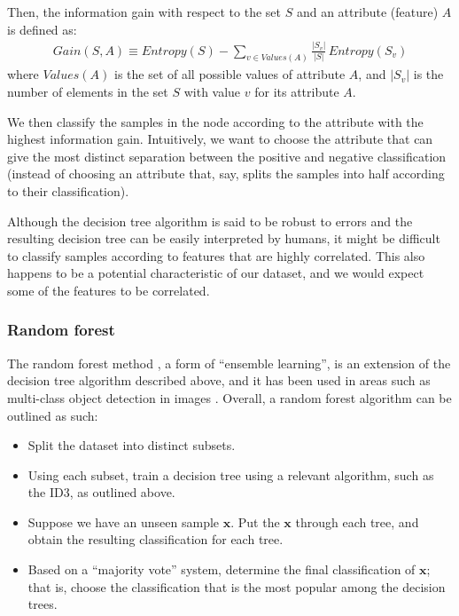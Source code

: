 \documentclass[12pt, twoside, a4paper]{article}
\begin{document}
Then, the information gain with respect to the set $S$ and an attribute (feature) $A$ is defined as:
\begin{align*}
Gain(S, A) \equiv Entropy(S) - \sum_{v \in Values(A)} \frac{|S_v|}{|S|} \, Entropy(S_v)
\end{align*}
where $Values(A)$ is the set of all possible values of attribute $A$, and $|S_v|$ is the number of elements in the set $S$ with value $v$ for its attribute $A$.

We then classify the samples in the node according to the attribute with the highest information gain. Intuitively, we want to choose the attribute that can give the most distinct separation between the positive and negative classification (instead of choosing an attribute that, say, splits the samples into half  according to their classification).

Although the decision tree algorithm is said to be robust to errors \cite{RefWorks:98} and the resulting decision tree can be easily interpreted by humans, it might be difficult to classify samples according to features that are highly correlated. This also happens to be a potential characteristic of our dataset, and we would expect some of the features to be correlated.

\subsubsection{Random forest}
The random forest method \cite{RefWorks:101}, a form of ``ensemble learning'', is an extension of the decision tree algorithm described above, and it has been used in areas such as multi-class object detection in images \cite{RefWorks:100}. Overall, a random forest algorithm can be outlined as such:
\begin{itemize}
\item Split the dataset into distinct subsets.
\item Using each subset, train a decision tree using a relevant algorithm, such as the ID3, as outlined above.
\item Suppose we have an unseen sample $\boldsymbol x$.  Put the $\boldsymbol x$ through each tree, and obtain the resulting classification for each tree.
\item Based on a ``majority vote'' system, determine the final classification of $\boldsymbol x$; that is, choose the classification that is the most popular among the decision trees.
\end{itemize}
\end{document}
